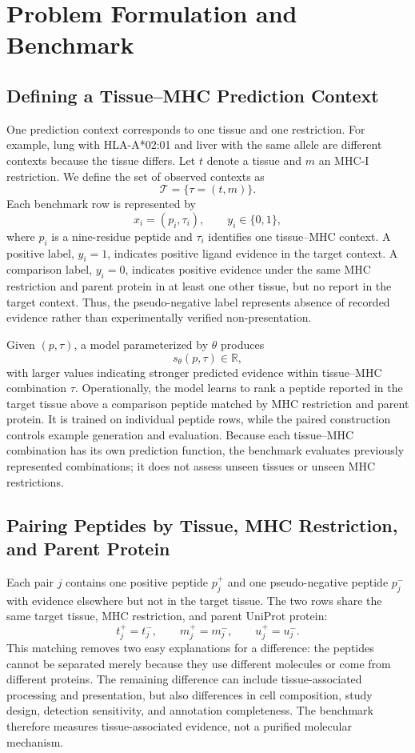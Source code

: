 \section{Problem Formulation and Benchmark}

\subsection{Defining a Tissue--MHC Prediction Context}

One prediction context corresponds to one tissue and one \plainMHCI{} restriction. For example, lung with HLA-A*02:01 and liver with the same allele are different contexts because the tissue differs. Let \(t\) denote a tissue and \(m\) an MHC-I restriction. We define the set of observed contexts as
\[
\mathcal{T}=\{\tau=(t,m)\}.
\]
Each benchmark row is represented by
\[
x_i=(p_i,\tau_i), \qquad y_i\in\{0,1\},
\]
where \(p_i\) is a nine-residue peptide and \(\tau_i\) identifies one tissue--MHC context. A positive label, \(y_i=1\), indicates positive ligand evidence in the target context. A comparison label, \(y_i=0\), indicates positive evidence under the same MHC restriction and parent protein in at least one other tissue, but no report in the target context. Thus, the pseudo-negative label represents absence of recorded evidence rather than experimentally verified non-presentation.

Given \((p,\tau)\), a model parameterized by \(\theta\) produces
\[
s_{\theta}(p,\tau)\in\mathbb{R},
\]
with larger values indicating stronger predicted evidence within tissue--MHC combination \(\tau\). Operationally, the model learns to rank a peptide reported in the target tissue above a comparison peptide matched by MHC restriction and parent protein. It is trained on individual peptide rows, while the paired construction controls example generation and evaluation. Because each tissue--MHC combination has its own prediction function, the benchmark evaluates previously represented combinations; it does not assess unseen tissues or unseen MHC restrictions.

\subsection{Pairing Peptides by Tissue, MHC Restriction, and Parent Protein}

Each pair \(j\) contains one positive peptide \(p_j^{+}\) and one pseudo-negative peptide \(p_j^{-}\) with evidence elsewhere but not in the target tissue. The two rows share the same target tissue, MHC restriction, and parent UniProt protein:
\[
t_j^{+}=t_j^{-}, \qquad
m_j^{+}=m_j^{-}, \qquad
u_j^{+}=u_j^{-}.
\]
This matching removes two easy explanations for a difference: the peptides cannot be separated merely because they use different \plainMHC{} molecules or come from different proteins. The remaining difference can include tissue-associated processing and presentation, but also differences in cell composition, study design, detection sensitivity, and annotation completeness. The benchmark therefore measures tissue-associated evidence, not a purified molecular mechanism.

